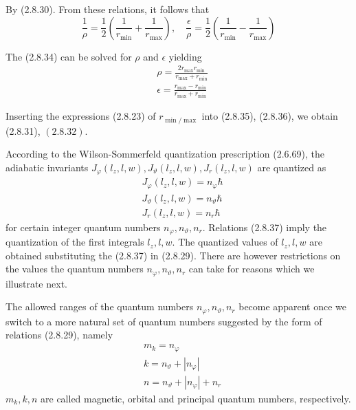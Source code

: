 \documentclass{article}
\begin{document}
By (2.8.30). From these relations, it follows that
$$
\begin{equation*}
\frac{1}{\rho}=\frac{1}{2}\left(\frac{1}{r_{\min }}+\frac{1}{r_{\max }}\right), \quad \frac{\epsilon}{\rho}=\frac{1}{2}\left(\frac{1}{r_{\min }}-\frac{1}{r_{\max }}\right) \tag{2.8.34}
\end{equation*}
$$

The (2.8.34) can be solved for $\rho$ and $\epsilon$ yielding
$$
\begin{align*}
& \rho=\frac{2 r_{\max } r_{\min }}{r_{\max }+r_{\min }}  \tag{2.8.35}\\
& \epsilon=\frac{r_{\max }-r_{\min }}{r_{\max }+r_{\min }} \tag{2.8.36}
\end{align*}
$$

Inserting the expressions (2.8.23) of $r_{\min / \max }$ into (2.8.35), (2.8.36), we obtain (2.8.31), $(2.8 .32)$.

According to the Wilson-Sommerfeld quantization prescription (2.6.69), the adiabatic invariants $J_{\varphi}\left(l_{z}, l, w\right), J_{\vartheta}\left(l_{z}, l, w\right), J_{r}\left(l_{z}, l, w\right)$ are quantized as
$$
\begin{align*}
& J_{\varphi}\left(l_{z}, l, w\right)=n_{\varphi} \hbar  \tag{2.8.37a}\\
& J_{\vartheta}\left(l_{z}, l, w\right)=n_{\vartheta} \hbar  \tag{2.8.37b}\\
& J_{r}\left(l_{z}, l, w\right)=n_{r} \hbar \tag{2.8.37c}
\end{align*}
$$
for certain integer quantum numbers $n_{\varphi}, n_{\vartheta}, n_{r}$.
Relations (2.8.37) imply the quantization of the first integrals $l_{z}, l, w$. The quantized values of $l_{z}, l, w$ are obtained substituting the (2.8.37) in (2.8.29). There are however restrictions on the values the quantum numbers $n_{\varphi}, n_{\vartheta}, n_{r}$ can take for reasons which we illustrate next.

The allowed ranges of the quantum numbers $n_{\varphi}, n_{\vartheta}, n_{r}$ become apparent once we switch to a more natural set of quantum numbers suggested by the form of relations (2.8.29), namely
$$
\begin{align*}
& m_{k}=n_{\varphi}  \tag{2.8.38a}\\
& k=n_{\vartheta}+\left|n_{\varphi}\right|  \tag{2.8.38b}\\
& n=n_{\vartheta}+\left|n_{\varphi}\right|+n_{r} \tag{2.8.38c}
\end{align*}
$$
$m_{k}, k, n$ are called magnetic, orbital and principal quantum numbers, respectively.
\end{document}
